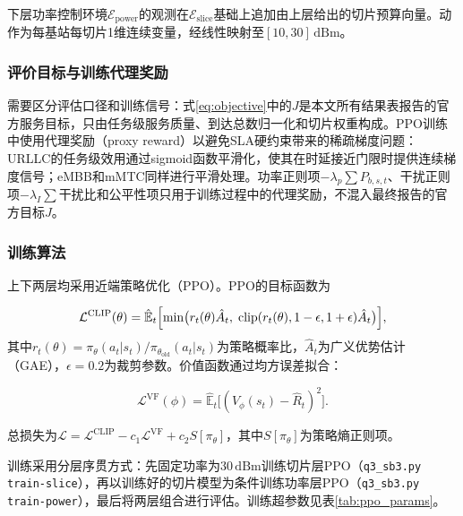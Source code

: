 \documentclass[UTF8,a4paper,12pt,fontset=fandol]{ctexart}
\begin{document}
下层功率控制环境$\mathcal{E}_{\text{power}}$的观测在$\mathcal{E}_{\text{slice}}$基础上追加由上层给出的切片预算向量。动作为每基站每切片1维连续变量，经线性映射至$[10,30]\,\mathrm{dBm}$。

\subsubsection{评价目标与训练代理奖励}

需要区分评估口径和训练信号：式\eqref{eq:objective}中的$J$是本文所有结果表报告的官方服务目标，只由任务级服务质量、到达总数归一化和切片权重构成。PPO训练中使用代理奖励（proxy reward）以避免SLA硬约束带来的稀疏梯度问题：URLLC的任务级效用通过sigmoid函数平滑化，使其在时延接近门限时提供连续梯度信号；eMBB和mMTC同样进行平滑处理。功率正则项$-\lambda_p\sum P_{b,s,t}$、干扰正则项$-\lambda_I\sum \text{干扰比}$和公平性项只用于训练过程中的代理奖励，不混入最终报告的官方目标$J$。

\subsubsection{训练算法}

上下两层均采用近端策略优化（PPO）\cite{schulman2017ppo}。PPO的目标函数为

\begin{equation}
  \mathcal{L}^{\text{CLIP}}(\theta) =
  \hat{\mathbb{E}}_t\Bigl[
    \min\bigl(
      r_t(\theta)\hat{A}_t,\;
      \operatorname{clip}(r_t(\theta), 1-\epsilon, 1+\epsilon)\hat{A}_t
    \bigr)
  \Bigr],
\end{equation}
其中$r_t(\theta)=\pi_\theta(a_t|s_t)/\pi_{\theta_{\text{old}}}(a_t|s_t)$为策略概率比，$\hat{A}_t$为广义优势估计（GAE），$\epsilon=0.2$为裁剪参数。价值函数通过均方误差拟合：

\begin{equation}
  \mathcal{L}^{\text{VF}}(\phi) = \hat{\mathbb{E}}_t\bigl[(V_\phi(s_t) - \hat{R}_t)^2\bigr].
\end{equation}

总损失为$\mathcal{L} = \mathcal{L}^{\text{CLIP}} - c_1 \mathcal{L}^{\text{VF}} + c_2 S[\pi_\theta]$，其中$S[\pi_\theta]$为策略熵正则项。

训练采用分层序贯方式：先固定功率为$30\,\mathrm{dBm}$训练切片层PPO（\texttt{q3\_sb3.py train-slice}），再以训练好的切片模型为条件训练功率层PPO（\texttt{q3\_sb3.py train-power}），最后将两层组合进行评估。训练超参数见表\ref{tab:ppo_params}。
\end{document}
